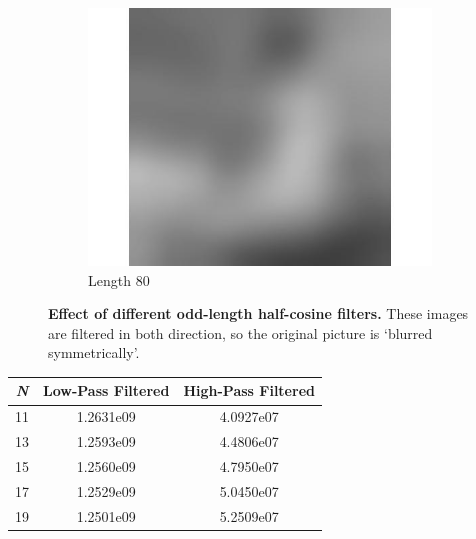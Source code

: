 \documentclass[a4paper, 11pt]{article}
\begin{document}
\begin{figure}[h]
\begin{center}
\begin{subfigure}[b]{0.3\textwidth}
		\includegraphics[width=\textwidth]{h_80.jpg}
		\caption{Length 80}
	\end{subfigure}
	\caption{\textbf{Effect of different odd-length half-cosine filters.} These images are filtered in both direction, so the original picture is `blurred symmetrically'. }
\end{center}
\end{figure}
\begin{center}
\begin{tabular}{|c | c | c|}
\hline
\textbf{\textit{N}} & \textbf{Low-Pass Filtered} & \textbf{High-Pass Filtered} \\
\hline
11 & 1.2631e09 & 4.0927e07 \\
\hline
13 & 1.2593e09 & 4.4806e07 \\
\hline
15 & 1.2560e09 & 4.7950e07 \\
\hline
17 & 1.2529e09 & 5.0450e07 \\
\hline 
19 & 1.2501e09 & 5.2509e07 \\
\hline
\end{tabular}
\end{center}
\end{document}
